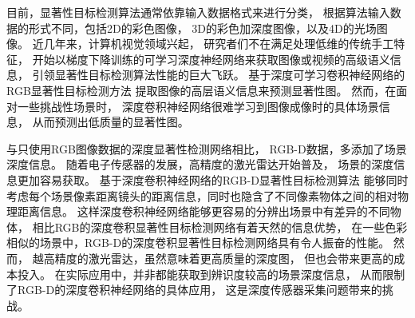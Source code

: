 



目前，显著性目标检测算法通常依靠输入数据格式来进行分类，
根据算法输入数据的形式不同，包括2D的彩色图像，
3D的彩色加深度图像，以及4D的光场图像。
近几年来，计算机视觉领域兴起，
研究者们不在满足处理低维的传统手工特征，
开始以梯度下降训练的可学习深度神经网络来获取图像或视频的高级语义信息，
引领显著性目标检测算法性能的巨大飞跃。
基于深度可学习卷积神经网络的RGB显著性目标检测方法
提取图像的高层语义信息来预测显著性图。
然而，在面对一些挑战性场景时，
深度卷积神经网络很难学习到图像成像时的具体场景信息，
从而预测出低质量的显著性图。



与只使用RGB图像数据的深度显著性检测网络相比，
RGB-D数据，多添加了场景深度信息。
随着电子传感器的发展，高精度的激光雷达开始普及，
场景的深度信息更加容易获取。
基于深度卷积神经网络的RGB-D显著性目标检测算法
能够同时考虑每个场景像素距离镜头的距离信息，同时也隐含了不同像素物体之间的相对物理距离信息。
这样深度卷积神经网络能够更容易的分辨出场景中有差异的不同物体，
相比RGB的深度卷积显著性目标检测网络有着天然的信息优势，
在一些色彩相似的场景中，RGB-D的深度卷积显著性目标检测网络具有令人振奋的性能。
然而，
越高精度的激光雷达，虽然意味着更高质量的深度图，
但也会带来更高的成本投入。
在实际应用中，并非都能获取到辨识度较高的场景深度信息，
从而限制了RGB-D的深度卷积神经网络的具体应用，
这是深度传感器采集问题带来的挑战。





